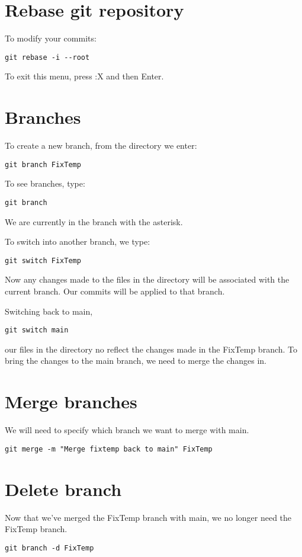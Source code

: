 \documentclass[12pt]{article}
\begin{document}
\section{Rebase git repository}
To modify your commits:
\begin{Verbatim}
git rebase -i --root
\end{Verbatim}
To exit this menu, press :X and then Enter.


\section{Branches}
To create a new branch, from the directory we enter:
\begin{Verbatim}
git branch FixTemp
\end{Verbatim}
To see branches, type:
\begin{Verbatim}
git branch
\end{Verbatim}
We are currently in the branch with the asterisk.\par
To switch into another branch, we type:
\begin{Verbatim}
git switch FixTemp
\end{Verbatim}
Now any changes made to the files in the directory will be associated with the current branch. Our commits will be applied to that branch.\par
Switching back to main,
\begin{Verbatim}
git switch main
\end{Verbatim}
our files in the directory no reflect the changes made in the FixTemp branch. To bring the changes to the main branch, we need to merge the changes in.

\section{Merge branches}
We will need to specify which branch we want to merge with main.
\begin{Verbatim}
git merge -m "Merge fixtemp back to main" FixTemp
\end{Verbatim}

\section{Delete branch}
Now that we've merged the FixTemp branch with main, we no longer need the FixTemp branch.
\begin{Verbatim}
git branch -d FixTemp
\end{Verbatim}
\end{document}
